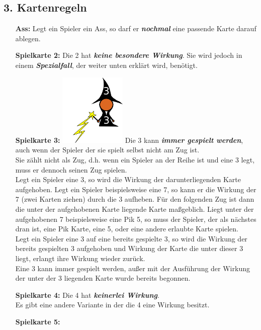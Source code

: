 \documentclass{article}
\begin{document}
\subsection*{3. Kartenregeln}       
\begin{itemize}
\item[\textbf{Ass:}] Legt ein Spieler ein Ass, so darf er \textit{\textbf{nochmal}} eine passende Karte darauf ablegen. 
\item[ \textbf{Spielkarte 2:}] Die 2 hat \textit{\textbf{keine besondere Wirkung}}. Sie wird jedoch in einem \textit{\textbf{Spezialfall}}, der weiter unten erklärt wird, benötigt.
\item[\textbf{Spielkarte 3:}]
\includegraphics[width=0.25\textwidth]{photos/wizard.png}
Die 3 kann \textit{\textbf{immer gespielt werden}}, auch wenn der Spieler der sie spielt selbst nicht am Zug ist. \\ Sie zählt nicht als Zug, d.h. wenn ein Spieler an der Reihe ist und eine 3 legt, muss er dennoch seinen Zug spielen. \\
Legt ein Spieler eine 3, so wird die Wirkung der darunterliegenden Karte aufgehoben. Legt ein Spieler beispielsweise eine 7, so kann er die Wirkung der 7 (zwei Karten ziehen) durch die 3 aufheben. Für den folgenden Zug ist dann die
unter der aufgehobenen Karte liegende Karte maßgeblich. Liegt unter der aufgehobenen 7 beispielsweise eine Pik 5, so muss der Spieler, der als nächstes dran ist, eine Pik Karte, eine 5, oder eine andere erlaubte Karte spielen. \\
Legt ein Spieler eine 3 auf eine bereits gespielte 3, so wird die Wirkung der bereits gespielten 3 aufgehoben und Wirkung der Karte die unter dieser 3 liegt, erlangt ihre Wirkung wieder zurück. \\ Eine 3 kann immer gespielt werden, außer mit der Ausführung der Wirkung der unter der 3 liegenden Karte wurde bereits begonnen.
\item[\textbf{Spielkarte 4:}]
Die 4 hat \textit{\textbf{keinerlei Wirkung}}. \\
Es gibt eine andere Variante in der die 4 eine Wirkung besitzt.
\item[\textbf{Spielkarte 5:}]

\end{itemize}
\end{document}
